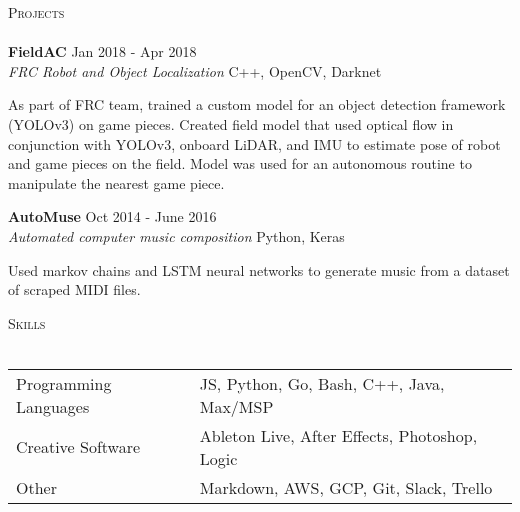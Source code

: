 \documentclass[a4paper]{article}
\newcommand{\lineunder} {
    \vspace*{-8pt} \\
    \hspace*{-18pt} \hrulefill \\
}
\newcommand{\header} [1] {
    {\hspace*{-18pt}\vspace*{6pt} \textsc{#1}}
    \vspace*{-6pt} \lineunder
}
\begin{document}
\header{Projects}

\noindent
\textbf{FieldAC} \hfill Jan 2018 - Apr 2018\\
\textit{FRC Robot and Object Localization} \hfill C++, OpenCV, Darknet\\
\vspace{-20pt}
\begin{paragraph}{}
As part of FRC team, trained a custom model for an object detection framework (YOLOv3) on game pieces. Created field model that used optical flow in conjunction with YOLOv3, onboard LiDAR, and IMU to estimate pose of robot and game pieces on the field. Model was used for an autonomous routine to manipulate the nearest game piece.\\

\end{paragraph}
\noindent
\textbf{AutoMuse} \hfill Oct 2014 - June 2016\\
\textit{Automated computer music composition} \hfill Python, Keras
\vspace{-10pt}
\begin{paragraph}{}
Used markov chains and LSTM neural networks to generate music from a dataset of scraped MIDI files. \\ 

\end{paragraph}

\noindent
\header{Skills}

\noindent
\begin{tabular}{ l l }
	Programming Languages & JS, Python, Go, Bash, C++, Java, Max/MSP \\
	Creative Software             & Ableton Live, After Effects, Photoshop, Logic    \\
	Other                  & Markdown, AWS, GCP, Git, Slack, Trello        \\
\end{tabular}
\vspace{8mm}
\noindent
\begin{center}
\end{center}
\ 
\end{document}

